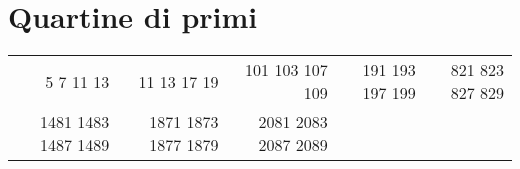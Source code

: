 \section{Quartine di primi}
\begin{center}
\footnotesize
\begin{tabular}{*{5}{r}}
\toprule 
 5 7 11 13&11 13 17 19&101 103 107 109&191 193 197 199&821 823 827 829\\
 1481 1483 1487 1489&1871 1873 1877 1879&2081 2083 2087 2089\\
\bottomrule
\end{tabular}
\end{center}